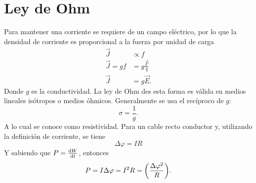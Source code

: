 \section{Ley de Ohm}
Para mantener una corriente se requiere de un campo eléctrico, por lo que la densidad de corriente es proporcional a la fuerza por unidad de carga
\begin{align}
    \vec{J} &\propto f \\
    \vec{J} = gf &= g\frac{\vec{F}}{q} \\
    \vec{J} &= g\vec{E}.
\end{align}
Donde $g$ es la conductividad. La ley de Ohm des esta forma es válida en medios lineales isótropos o medios óhmicos. Generalmente se usa el recíproco de $g$:
\begin{equation}
    \sigma = \frac{1}{g}.
\end{equation}
A lo cual se conoce como resistividad. Para un cable recto conductor y, utilizando la definición de corriente, se tiene
\begin{equation}
    \Delta \varphi = IR
\end{equation}
Y sabiendo que $P = \dv{W}{t}$, entonces
\begin{equation}
    P = I\Delta \varphi = I^2 R = \qty(\frac{\Delta \varphi ^2}{R}).
\end{equation}

